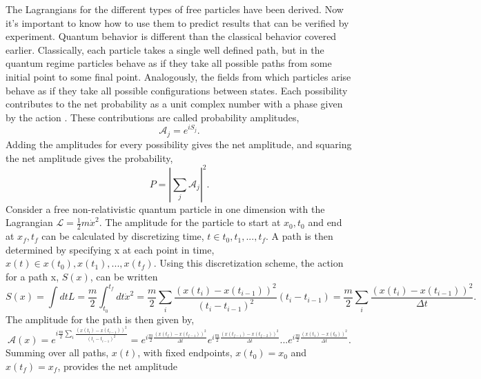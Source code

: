 \documentclass[12pt]{article}
\begin{document}
The Lagrangians for the different types of free particles have been derived. Now it's important to know how to use them to predict results that can be verified by experiment. Quantum behavior is different than the classical behavior covered earlier. Classically, each particle takes a single well defined path, but in the quantum regime particles behave as if they take all possible paths from some initial point to some final point. Analogously, the fields from which particles arise behave as if they take all possible configurations between states. Each possibility contributes to the net probability as a unit complex number with a phase given by the action \cite{feynhibbs}. These contributions are called probability amplitudes, 
\begin{equation}
\mathcal{A}_j = e^{iS_{j}}. 
\end{equation}
Adding the amplitudes for every possibility gives the net amplitude, and squaring the net amplitude gives the probability,   
\begin{equation}
P = |\sum_j \mathcal{A}_j|^2.
\end{equation}
Consider a free non-relativistic quantum particle in one dimension with the Lagrangian $\mathcal{L} = \frac{1}{2}m\dot{x}^2$. The amplitude for the particle to start at $x_0, t_0$ and end at $x_f, t_f$ can be calculated by discretizing time, $t \in {t_0, t_1, ..., t_f}$. A path is then determined by specifying x at each point in time, $x(t) \in {x(t_0), x(t_1), ..., x(t_f)}$. Using this discretization scheme, the action for a path x, $S(x)$, can be written
\begin{equation}
S(x) = \int dt L = \frac{m}{2} \int_{t_0}^{t_f} dt \dot{x}^2 = \frac{m}{2} \sum_i \frac{(x(t_i) - x(t_{i-1}))^2}{(t_i - t_{i-1})^2} (t_i - t_{i-1})  
= \frac{m}{2} \sum_i \frac{(x(t_i) - x(t_{i-1}))^2}{\Delta t}.
\end{equation}
The amplitude for the path is then given by, 
\begin{equation}
\mathcal{A}(x) = e^{i\frac{m}{2} \sum_i \frac{(x(t_i) - x(t_{i-1}))^2}{(t_i - t_{i-1})^2}} = e^{i\frac{m}{2}\frac{(x(t_f) - x(t_{f-1}))^2}{\Delta t}}e^{i\frac{m}{2}\frac{(x(t_{f-1}) - x(t_{f-2}))^2}{\Delta t}}...e^{i\frac{m}{2}\frac{(x(t_1) - x(t_{0}))^2}{\Delta t}}.
\end{equation}
Summing over all paths, $x(t)$, with fixed endpoints, $x(t_0) = x_0$ and $x(t_f) = x_f$, provides the net amplitude 
\end{document}
